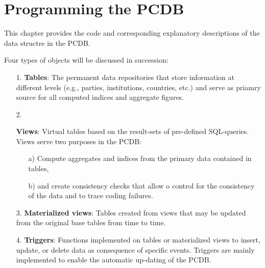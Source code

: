 \chapter{Programming the PCDB}\label{chap_programming_the_PCDB}

This chapter provides the code and corresponding explanatory descriptions of the data structre in the PCDB. 

Four types of objects will be discussed in succession:
\begin{itemize}
\item[1.]{{\bf Tables}: The permanent data repositories that store information at different levels (e.g., parties, institutions, countries, etc.) and serve as priamry source for all computed indices and aggregate figures.}
\item[2.]{{\bf Views}: Virtual tables based on the result-sets of pre-defined SQL-queries.
Views serve two purposes in the PCDB:
\begin{itemize}
\item[a)]Compute aggregates and indices from the primary data contained in tables,
\item[b)]and create consistency checks that allow o control for the consistency of the data and to trace coding failures.
\end{itemize}}
\item[3.]{{\bf Materialized views}: Tables created from views that may be updated from the original base tables from time to time.}
\item[4.]{{\bf Triggers}: Functions implemented on tables or materialized views to insert, update, or delete data as consequence of specific events. Triggers are mainly implemented to enable the automatic up-dating of the PCDB.}
\end{itemize}
